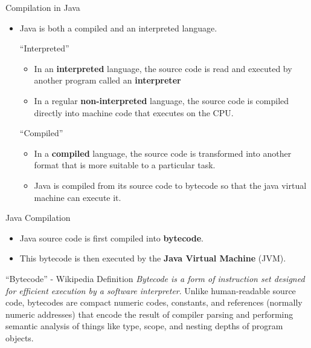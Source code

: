 \documentclass[table,xcolor=table]{IFMG-beamer}
\begin{document}
\begin{frame}{Compilation in Java}
  \begin{itemize}[<+->]
    \item Java is both a compiled and an interpreted language.
    \begin{block}{``Interpreted''}
      \begin{itemize}
        \item In an \textbf{interpreted} language, the source code is read and executed by another program called an \textbf{interpreter} \\
        \item In a regular \textbf{non-interpreted} language, the source code is compiled directly into machine code that executes on the CPU. \\
      \end{itemize}
    \end{block}
    \begin{block}{``Compiled''}
      \begin{itemize}
        \item In a \textbf{compiled} language, the source code is transformed into another format that is more suitable to a particular task. 
        \item Java is compiled from its source code to bytecode so that the java virtual machine can execute it.  \\
      \end{itemize}
    \end{block}
  \end{itemize}

\end{frame}

\begin{frame}{Java Compilation}
  \begin{itemize}
    \item Java source code is first compiled into \textbf{bytecode}.
    \item This bytecode is then executed by the \textbf{Java Virtual Machine} (JVM).
  \end{itemize}

  \begin{block}{``Bytecode'' - Wikipedia Definition}
    \textit{Bytecode is a form of instruction set designed for efficient execution by a software interpreter}. Unlike human-readable source code, bytecodes are compact numeric codes, constants, and references (normally numeric addresses) that encode the result of compiler parsing and performing semantic analysis of things like type, scope, and nesting depths of program objects.
  \end{block}
\end{frame}
\end{document}
